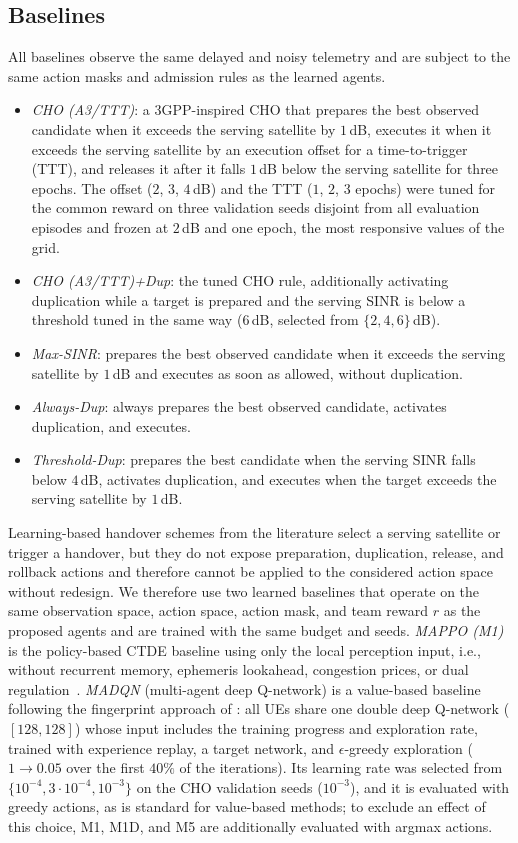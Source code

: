 \documentclass[journal]{IEEEtran}
\begin{document}
\subsection{Baselines}
All baselines observe the same delayed and noisy telemetry and are subject
to the same action masks and admission rules as the learned agents.
\begin{itemize}
\item \emph{CHO (A3/TTT)}: a 3GPP-inspired CHO that prepares the best
observed candidate when it exceeds the serving satellite by $1$\,dB, executes
it when it exceeds the serving satellite by an execution offset for a
time-to-trigger (TTT), and releases it after it falls $1$\,dB below the
serving satellite for three epochs. The offset ($2$, $3$, $4$\,dB) and the TTT
($1$, $2$, $3$ epochs) were tuned for the common reward on three validation
seeds disjoint from all evaluation episodes and frozen at $2$\,dB and one
epoch, the most responsive values of the grid.
\item \emph{CHO (A3/TTT)+Dup}: the tuned CHO rule, additionally activating
duplication while a target is prepared and the serving SINR is below a
threshold tuned in the same way ($6$\,dB, selected from $\{2,4,6\}$\,dB).
\item \emph{Max-SINR}: prepares the best observed candidate when it exceeds
the serving satellite by $1$\,dB and executes as soon as allowed, without
duplication.
\item \emph{Always-Dup}: always prepares the best observed candidate,
activates duplication, and executes.
\item \emph{Threshold-Dup}: prepares the best candidate when the serving SINR
falls below $4$\,dB, activates duplication, and executes when the target
exceeds the serving satellite by $1$\,dB.
\end{itemize}
Learning-based handover schemes from the literature
\cite{yang2023dqn,liu2024marlho,yang2024fingerprints,zhao2026hrl} select a
serving satellite or trigger a handover, but they do not expose preparation,
duplication, release, and rollback actions and therefore cannot be applied
to the considered action space without redesign. We therefore use two
learned baselines that operate on the same observation space, action space,
action mask, and team reward $r$ as the proposed agents and are trained with
the same budget and seeds. \emph{MAPPO (M1)} is the policy-based CTDE baseline using only the local
perception input, i.e., without recurrent memory, ephemeris lookahead,
congestion prices, or dual regulation~\cite{yu2022mappo}. \emph{MADQN} (multi-agent deep Q-network) is a value-based
baseline following the fingerprint approach of \cite{yang2024fingerprints}:
all UEs share one double deep Q-network ($[128,128]$) whose input includes the
training progress and exploration rate, trained with experience replay, a
target network, and $\epsilon$-greedy exploration ($1\to0.05$ over the first
$40\%$ of the iterations). Its learning rate was selected from
$\{10^{-4},3\cdot10^{-4},10^{-3}\}$ on the CHO validation seeds ($10^{-3}$),
and it is evaluated with greedy actions, as is standard for value-based
methods; to exclude an effect of this choice, M1, M1D, and M5 are additionally
evaluated with argmax actions.
\end{document}
